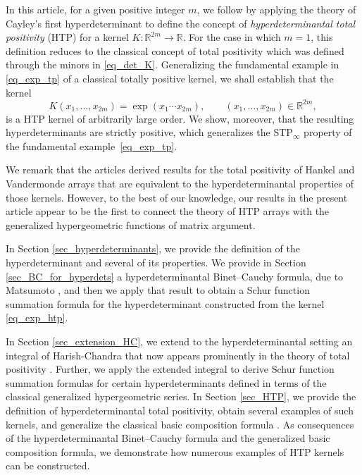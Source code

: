 \documentclass[10pt,a4paper]{amsart}
\numberwithin{equation}{section}
\def\R{{\mathbb R}}
\begin{document}
In this article, for a given positive integer $m$, we follow \cite{Johnson_Richards,wanglixu} by applying the theory of Cayley's first hyperdeterminant to define the concept of {\it hyperdeterminantal total positivity} (HTP) for a kernel $K \colon \R^{2m} \to \R$. For the case in which $m=1$, this definition reduces to the classical concept of total positivity which was defined through the minors in \eqref{eq_det_K}. Generalizing the fundamental example in \eqref{eq_exp_tp} of a classical totally positive kernel, we shall establish that the kernel
\begin{equation}
K(x_1,\dots,x_{2m}) = \exp(x_1\cdots x_{2m}), \qquad (x_1,\dots,x_{2m}) \in \R^{2m},\label{eq_exp_htp}
\end{equation}
is a HTP kernel of arbitrarily large order. We show, moreover, that the resulting hyperdeterminants are strictly positive, which generalizes the STP$_\infty$ property of the fundamental example~\eqref{eq_exp_tp}.

We remark that the articles \cite{wanglixu} derived results for the total positivity of Hankel and Vandermonde arrays that are equivalent to the hyperdeterminantal properties of those kernels. However, to the best of our knowledge, our results in the present article appear to be the first to connect the theory of HTP arrays with the generalized hypergeometric functions of matrix argument.

In Section \ref{sec_hyperdeterminants}, we provide the definition of the hyperdeterminant and several of its properties. We provide in Section \ref{sec_BC_for_hyperdets} a hyperdeterminantal Binet--Cauchy formula, due to Matsumoto \cite{matsumoto}, and then we apply that result to obtain a Schur function summation formula for the hyperdeterminant constructed from the kernel \eqref{eq_exp_htp}.

In Section \ref{sec_extension_HC}, we extend to the hyperdeterminantal setting an integral of Harish-Chandra \cite{harishchandra} that now appears prominently in the theory of total positivity \cite{grossrichards89,grossrichards95}. Further, we apply the extended integral to derive Schur function summation formulas for certain hyperdeterminants defined in terms of the classical generalized hypergeometric series. In Section \ref{sec_HTP}, we provide the definition of hyperdeterminantal total positivity, obtain several examples of such kernels, and generalize the classical basic composition formula \cite[p.~17]{Karlin}. As consequences of the hyperdeterminantal Binet--Cauchy formula and the generalized basic composition formula, we demonstrate how numerous examples of HTP kernels can be constructed.
\end{document}
